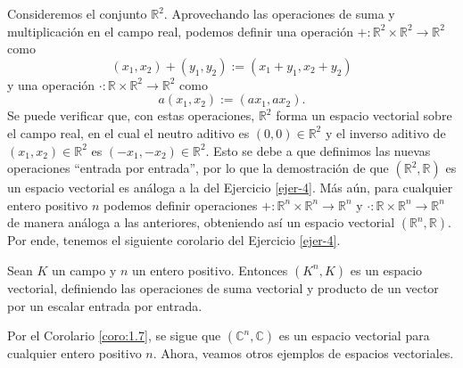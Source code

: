 \documentclass[apuntes]{subfiles}
\begin{document}

Consideremos el conjunto $\mathbb{R}^2$. Aprovechando las operaciones de suma y multiplicación en el campo real, podemos definir una operación $+:\mathbb{R}^2\times\mathbb{R}^2\to \mathbb{R}^2$ como
\[
    (x_1, x_2) + (y_1,y_2) := (x_1+y_1,x_2+y_2)
\] 
y una operación $\cdot:\mathbb{R}\times \mathbb{R}^2\to \mathbb{R}^2$ como
\[
    a(x_1,x_2) := (ax_1,ax_2).
\] 
Se puede verificar que, con estas operaciones, $\mathbb{R}^2$ forma un espacio vectorial sobre el campo real, en el cual el neutro aditivo es $(0,0)\in\mathbb{R}^2$ y el inverso aditivo de $(x_1,x_2)\in\mathbb{R}^2$ es $(-x_1,-x_2)\in\mathbb{R}^2$. Esto se debe a que definimos las nuevas operaciones ``entrada por entrada'', por lo que la demostración de que $(\mathbb{R}^2,\mathbb{R})$ es un espacio vectorial es análoga a la del Ejercicio \ref{ejer-4}. Más aún, para cualquier entero positivo $n$ podemos definir operaciones $+:\mathbb{R}^n\times \mathbb{R}^n\to \mathbb{R}^n$ y $\cdot:\mathbb{R}\times \mathbb{R}^n\to \mathbb{R}^n$ de manera análoga a las anteriores, obteniendo así un espacio vectorial $(\mathbb{R}^n,\mathbb{R})$. Por ende, tenemos el siguiente corolario del Ejercicio \ref{ejer-4}.

\begin{coro}\label{coro:1.7}
    
    Sean $K$ un campo y $n$ un entero positivo. Entonces $(K^n,K)$ es un espacio vectorial, definiendo las operaciones de suma vectorial y producto de un vector por un escalar entrada por entrada.
\end{coro}

\noindent Por el Corolario \ref{coro:1.7}, se sigue que $(\mathbb{C}^n,\mathbb{C})$ es un espacio vectorial para cualquier entero positivo $n$. Ahora, veamos otros ejemplos de espacios vectoriales. \\
\end{document}
